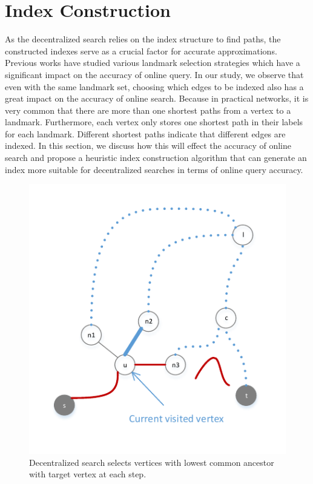 \section{Index Construction}
\label{preprocessing}


As the decentralized search relies on the index structure to find paths, the constructed indexes serve as a crucial factor for accurate approximations. Previous works have studied various landmark selection strategies which have a significant impact on the accuracy of online query. In our study, we observe that even with the same landmark set, choosing which edges to be indexed also has a great impact on the accuracy of online search. Because in practical networks, it is very common that there are more than one shortest paths from a vertex to a landmark. Furthermore, each vertex only stores one shortest path in their labels for each landmark. Different shortest paths indicate that different edges are indexed. In this section, we discuss how this will effect the accuracy of online search and propose a heuristic index construction algorithm that can generate an index more suitable for decentralized searches in terms of online query accuracy.


\begin{figure}[t]
    \centering
    \includegraphics[width=\linewidth]{../figures/new_illustrate/vis_dec.pdf}
    \caption{Decentralized search selects vertices with lowest common ancestor with target vertex at each step.}
    \label{fig:vis_dec}
\end{figure}

